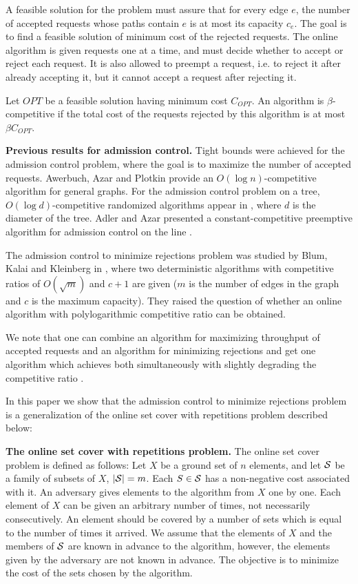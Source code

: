 \documentclass{sig-alternate}
\def \SS   {{\cal S}}
\begin{document}
A feasible solution for the problem must assure that for every
edge $e$, the number of accepted requests whose paths contain $e$
is at most its capacity $c_e$. The goal is to find a feasible
solution of minimum cost of the rejected requests. The online
algorithm is given requests one at a time, and must decide whether
to accept or reject each request. It is also allowed to preempt a
request, i.e. to reject it after already accepting it, but it
cannot accept a request after rejecting it.

Let $OPT$ be a feasible solution having minimum cost $C_{OPT}$. An
algorithm is $\beta$-competitive if the total cost of the requests
rejected by this algorithm is at most $\beta C_{OPT}$.

\textbf{Previous results for admission control.} Tight bounds were
achieved for the admission control problem, where the goal is to
maximize the number of accepted requests. Awerbuch, Azar and
Plotkin \cite{AAP93} provide an $O(\log n)$-competitive algorithm
for general graphs. For the admission control problem on a tree,
$O(\log d)$-competitive randomized algorithms appear in
\cite{ABFR94,AGLR94}, where $d$ is the diameter of the tree. Adler
and Azar presented a constant-competitive preemptive algorithm for
admission control on the line \cite{AdAz03}.

The admission control to minimize rejections problem was studied
by Blum, Kalai and Kleinberg in \cite{BlKaKl01}, where two
deterministic algorithms with competitive ratios of $O(\sqrt{m})$
and $c+1$ are given ($m$ is the number of edges in the graph and
$c$ is the maximum capacity). They raised the question of whether
an online algorithm with polylogarithmic competitive ratio can be
obtained.

We note that one can combine an algorithm for maximizing
throughput of accepted requests and an algorithm for minimizing
rejections and get one algorithm which achieves both
simultaneously with slightly degrading the competitive ratio
\cite{ABM03,BM04}.

In this paper we show that the admission control to minimize
rejections problem is a generalization of the online set cover
with repetitions problem described below:

\textbf{The online set cover with repetitions problem.} The online
set cover problem is defined as follows: Let $X$ be a ground set
of $n$ elements, and let $\SS$ be a family of subsets of $X$,
$|\SS|=m$. Each $S \in \SS$ has a non-negative cost associated
with it. An adversary gives elements to the algorithm from $X$ one
by one. Each element of $X$ can be given an arbitrary number of
times, not necessarily consecutively. An element should be covered
by a number of sets which is equal to the number of times it
arrived. We assume that the elements of $X$ and the members of
$\SS$ are known in advance to the algorithm, however, the elements
given by the adversary are not known in advance. The objective is
to minimize the cost of the sets chosen by the algorithm.
\end{document}
